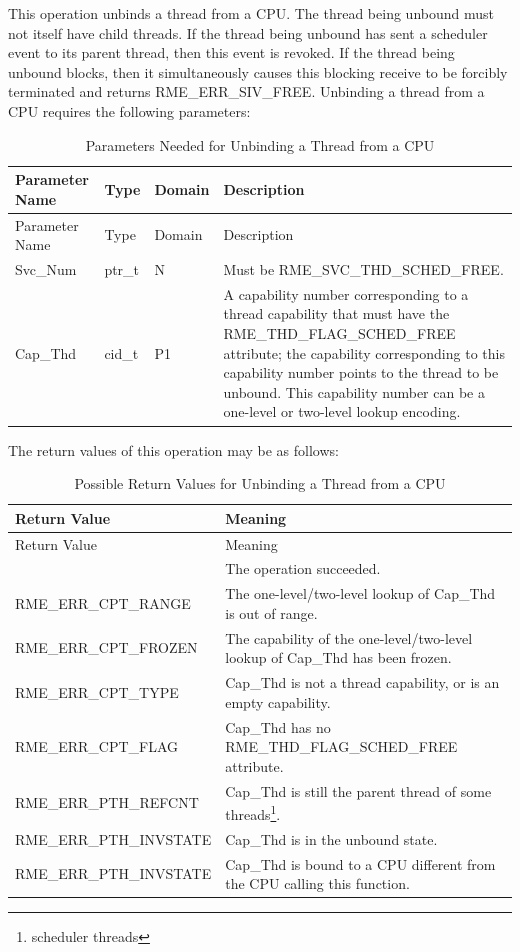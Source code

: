 This operation unbinds a thread from a CPU. The thread being unbound must not itself have child threads. If the thread being unbound has sent a scheduler event to its parent thread, then this event is revoked. If the thread being unbound blocks, then it simultaneously causes this blocking receive to be forcibly terminated and returns RME\_ERR\_SIV\_FREE. Unbinding a thread from a CPU requires the following parameters:

\begin{xltabular}{\textwidth}{@{}>{\hsize\raggedright\arraybackslash}X>{\hsize\raggedright\arraybackslash}X>{\hsize\raggedright\arraybackslash}X>{\hsize\raggedright\arraybackslash}X@{}}
\caption{Parameters Needed for Unbinding a Thread from a CPU}\label{tab:4-26-unbind-thread-from-cpu-parameters}\\
\toprule
Parameter Name & Type & Domain & Description\tabularnewline
\endfirsthead
\toprule
Parameter Name & Type & Domain & Description\tabularnewline
\midrule
\endhead
\bottomrule
\endlastfoot
Svc\_Num & ptr\_t & N &
Must be RME\_SVC\_THD\_SCHED\_FREE.\tabularnewline
Cap\_Thd & cid\_t & P1 &
A capability number corresponding to a thread capability that must have the RME\_THD\_FLAG\_SCHED\_FREE attribute; the capability corresponding to this capability number points to the thread to be unbound. This capability number can be a one-level or two-level lookup encoding.\tabularnewline
\end{xltabular}
\nopagebreak[4]

The return values of this operation may be as follows:

\begin{xltabular}{\textwidth}{@{}>{\hsize\raggedright\arraybackslash}X>{\hsize\raggedright\arraybackslash}X@{}}
\caption{Possible Return Values for Unbinding a Thread from a CPU}\label{tab:4-27-unbind-thread-from-cpu-return-values}\\
\toprule
Return Value & Meaning\tabularnewline
\endfirsthead
\toprule
Return Value & Meaning\tabularnewline
\midrule
\endhead
\bottomrule
{} & The operation succeeded.\tabularnewline
    RME\_ERR\_CPT\_RANGE & The one-level/two-level lookup of Cap\_Thd is out of range.\tabularnewline
    RME\_ERR\_CPT\_FROZEN & The capability of the one-level/two-level lookup of Cap\_Thd has been frozen.\tabularnewline
    RME\_ERR\_CPT\_TYPE & Cap\_Thd is not a thread capability, or is an empty capability.\tabularnewline
    RME\_ERR\_CPT\_FLAG & Cap\_Thd has no RME\_THD\_FLAG\_SCHED\_FREE attribute.\tabularnewline
    RME\_ERR\_PTH\_REFCNT & Cap\_Thd is still the parent thread of some threads\footnote{scheduler threads}.\tabularnewline
    RME\_ERR\_PTH\_INVSTATE & Cap\_Thd is in the unbound state.\tabularnewline
    RME\_ERR\_PTH\_INVSTATE & Cap\_Thd is bound to a CPU different from the CPU calling this function.\tabularnewline
\end{xltabular}
\nopagebreak[4]

